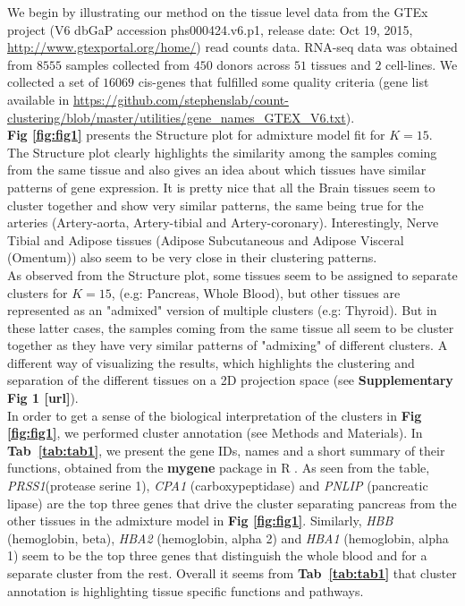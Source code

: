 We begin by illustrating our method on the tissue level data from the  GTEx project (V6 dbGaP accession phs000424.v6.p1, release date: Oct 19, 2015, \url{http://www.gtexportal.org/home/}) read counts data.  RNA-seq data was obtained from $8555$ samples collected from $450$ donors across $51$ tissues and $2$ cell-lines. We collected a set of $16069$ cis-genes that fulfilled some quality criteria (gene list available in \url{https://github.com/stephenslab/count-clustering/blob/master/utilities/gene_names_GTEX_V6.txt}).  \\[1 pt]
 \textbf{Fig \ref{fig:fig1}} presents the Structure plot for admixture model fit for $K=15$. The Structure plot clearly highlights the similarity among the samples coming from the same tissue and also gives an idea about which tissues have similar patterns of gene expression. It is  pretty nice that all the Brain tissues seem to cluster together and show very similar patterns, the same being true for the arteries (Artery-aorta, Artery-tibial and Artery-coronary). Interestingly, Nerve Tibial  and Adipose tissues (Adipose Subcutaneous and Adipose Visceral (Omentum)) also seem to be very close in their clustering patterns. \\[1 pt]
 As observed from the Structure plot, some tissues seem to be assigned to separate clusters for $K=15$, (e.g: Pancreas, Whole Blood), but other tissues are represented as an "admixed" version of multiple clusters (e.g: Thyroid). But in these latter cases, the samples coming from the same tissue all seem to be cluster together as they have very similar patterns of "admixing" of different clusters. A different way of visualizing the results, which highlights the clustering and separation of the different tissues on a 2D projection space (see \textbf{Supplementary Fig 1 [url]}). \\[1 pt]
 In order to get a sense of the biological interpretation of the clusters in  \textbf{Fig \ref{fig:fig1}}, we performed cluster annotation (see Methods and Materials). In \textbf{Tab~\ref{tab:tab1}}, we present the gene IDs, names and a short summary of their functions, obtained from the \textbf{mygene} package in R \cite{Thompson2014}. As seen from the table, \textit{PRSS1}(protease serine 1), \textit{CPA1} (carboxypeptidase) and \textit{PNLIP} (pancreatic lipase) are the  top three genes that drive the cluster separating pancreas from the other tissues in the admixture model in \textbf{Fig \ref{fig:fig1}}. Similarly, \textit{HBB} (hemoglobin, beta), \textit{HBA2} (hemoglobin, alpha 2) and \textit{HBA1} (hemoglobin, alpha 1) seem to be the top three genes that distinguish the whole blood and for a separate cluster from the rest. Overall it seems from \textbf{Tab~\ref{tab:tab1}} that cluster annotation is highlighting tissue specific functions and pathways.\\[2 pt]

